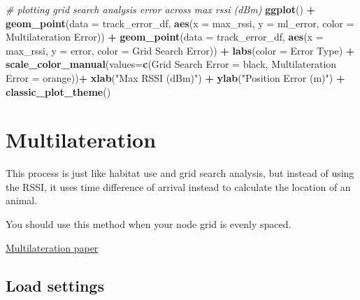 \documentclass[
]{book}
\newenvironment{Shaded}{\begin{snugshade}}{\end{snugshade}}
\newcommand{\AttributeTok}[1]{\textcolor[rgb]{0.13,0.29,0.53}{#1}}
\newcommand{\CommentTok}[1]{\textcolor[rgb]{0.56,0.35,0.01}{\textit{#1}}}
\newcommand{\FunctionTok}[1]{\textcolor[rgb]{0.13,0.29,0.53}{\textbf{#1}}}
\newcommand{\NormalTok}[1]{#1}
\newcommand{\OtherTok}[1]{\textcolor[rgb]{0.56,0.35,0.01}{#1}}
\newcommand{\SpecialCharTok}[1]{\textcolor[rgb]{0.81,0.36,0.00}{\textbf{#1}}}
\newcommand{\StringTok}[1]{\textcolor[rgb]{0.31,0.60,0.02}{#1}}
\begin{document}
\begin{Shaded}
\begin{Highlighting}[]
\CommentTok{\# plotting grid search analysis error across max rssi (dBm)}
\FunctionTok{ggplot}\NormalTok{() }\SpecialCharTok{+}
  \FunctionTok{geom\_point}\NormalTok{(}\AttributeTok{data =}\NormalTok{ track\_error\_df, }
             \FunctionTok{aes}\NormalTok{(}\AttributeTok{x =}\NormalTok{ max\_rssi, }
                 \AttributeTok{y =}\NormalTok{ ml\_error,}
                 \AttributeTok{color =} \StringTok{\textquotesingle{}Multilateration Error\textquotesingle{}}\NormalTok{)) }\SpecialCharTok{+}
  \FunctionTok{geom\_point}\NormalTok{(}\AttributeTok{data =}\NormalTok{ track\_error\_df, }
             \FunctionTok{aes}\NormalTok{(}\AttributeTok{x =}\NormalTok{ max\_rssi, }
                 \AttributeTok{y =}\NormalTok{ error,}
                 \AttributeTok{color =} \StringTok{\textquotesingle{}Grid Search Error\textquotesingle{}}\NormalTok{)) }\SpecialCharTok{+}
  \FunctionTok{labs}\NormalTok{(}\AttributeTok{color =} \StringTok{\textquotesingle{}Error Type\textquotesingle{}}\NormalTok{) }\SpecialCharTok{+}
  \FunctionTok{scale\_color\_manual}\NormalTok{(}\AttributeTok{values=}\FunctionTok{c}\NormalTok{(}\StringTok{\textquotesingle{}Grid Search Error\textquotesingle{}} \OtherTok{=} \StringTok{\textquotesingle{}black\textquotesingle{}}\NormalTok{,}
                              \StringTok{\textquotesingle{}Multilateration Error\textquotesingle{}} \OtherTok{=} \StringTok{\textquotesingle{}orange\textquotesingle{}}\NormalTok{))}\SpecialCharTok{+}
  \FunctionTok{xlab}\NormalTok{(}\StringTok{"Max RSSI (dBm)"}\NormalTok{) }\SpecialCharTok{+}
  \FunctionTok{ylab}\NormalTok{(}\StringTok{"Position Error (m)"}\NormalTok{) }\SpecialCharTok{+}
  \FunctionTok{classic\_plot\_theme}\NormalTok{()}
\end{Highlighting}
\end{Shaded}

\chapter{Multilateration}\label{multilateration}

This process is just like habitat use and grid search analysis, but instead of using the RSSI, it uses time difference of arrival instead to calculate the location of an animal.

You should use this method when your node grid is evenly spaced.

\href{https://pubmed.ncbi.nlm.nih.gov/35169450/}{Multilateration paper}

\section{Load settings}\label{load-settings-4}
\end{document}
